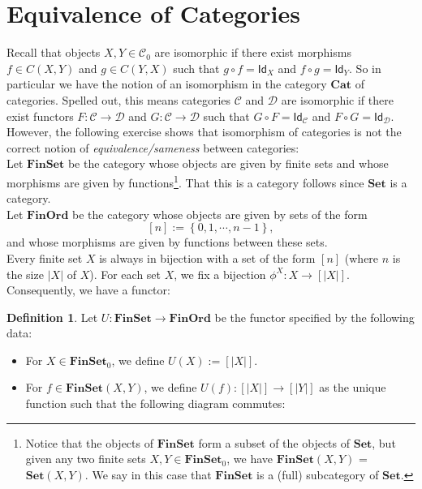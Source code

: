 \documentclass[a4paper,11pt, oneside,titlepage=false]{scrbook}
\theoremstyle{plain}
\theoremstyle{definition}
\newtheorem{dfn}[thm]{Definition}
\newcommand{\cfont}[1]{\ensuremath{\mathsf{#1}}}
\newcommand{\Cat}[1]{\mathcal{#1}}
\newcommand{\CC}{\Cat{C}}
\newcommand{\DD}{\Cat{D}}
\newcommand{\Catb}[1]{\mathbf{#1}}
\newcommand{\SET}{\Catb{Set}}
\newcommand{\FINSET}{\Catb{FinSet}}
\newcommand{\CAT}{\Catb{Cat}}
\newcommand{\Ob}[1]{{#1}_0}
\newcommand{\CHom}[3]{{#1}(#2,#3)}
\newcommand{\Id}[1][]{\cfont{Id}_{#1}}
\newcommand{\co}[2]{\ensuremath{#2 \circ #1}}
\begin{document}
\section{Equivalence of Categories}
Recall that objects $X,Y\in\Ob{\CC}$ are isomorphic if there exist morphisms $f\in\CHom{C}{X}{Y}$ and $g\in\CHom{C}{Y}{X}$ such that $\co{f}{g} = \Id[X]$ and $\co{g}{f} = \Id[Y]$. So in particular we have the notion of an isomorphism in the category $\CAT$ of categories. Spelled out, this means categories $\CC$ and $\DD$ are isomorphic if there exist functors $F:\CC\to\DD$ and $G:\CC\to\DD$ such that $\co{F}{G}= \Id[\CC]$ and $\co{G}{F} = \Id[\DD]$.\\
However, the following exercise shows that isomorphism of categories is not the correct notion of \textit{equivalence/sameness} between categories:\\
Let $\FINSET$ be the category whose objects are given by finite sets and whose morphisms are given by functions\footnote{Notice that the objects of $\FINSET$ form a subset of the objects of $\SET$, but given any two finite sets $X,Y \in \Ob{\FINSET}$, we have $\CHom{\FINSET}{X}{Y}$ = $\CHom{\SET}{X}{Y}$. We say in this case that $\FINSET$ is a (full) subcategory of $\SET$.}. That this is a category follows since $\SET$ is a category.\\
Let $\Catb{FinOrd}$ be the category whose objects are given by sets of the form 
\[
[n] := \left\{0,1,\cdots,n-1\right\},
\]
and whose morphisms are given by functions between these sets.\\
Every finite set $X$ is always in bijection with a set of the form $[n]$ (where $n$ is the size $\vert X\vert$ of $X$). For each set $X$, we fix a bijection $\phi^X: X\to [\vert X\vert]$. Consequently, we have a functor:
\begin{dfn} Let $U: \FINSET\to \Catb{FinOrd}$ be the functor specified by the following data:
\begin{itemize}
\item For $X\in \Ob{\FINSET}$, we define $U(X) := [\vert X\vert]$.
\item For $f\in \CHom{\FINSET}{X}{Y}$, we define $U(f): [\vert X\vert]\to [\vert Y\vert]$ as the unique function such that the following diagram commutes:
\begin{center}
\end{center}
\end{itemize}
\end{dfn}
\end{document}
